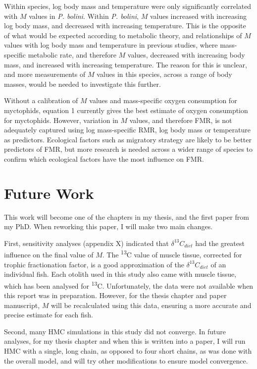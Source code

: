 \documentclass[12pt, titlepage]{article}
\begin{document}
Within species, log body mass and temperature were only significantly correlated with $M$ values in \textit{P. bolini}.
Within \textit{P. bolini}, $M$ values increased with increasing log body mass, and decreased with increasing temperature.
This is the opposite of what would be expected according to metabolic theory, and relationships of $M$ values with log body mass and temperature in previous studies, where mass-specific metabolic rate, and therefore $M$ values, decreased with increasing body mass, and increased with increasing temperature. %
The reason for this is unclear, and more measurements of $M$ values in this species, across a range of body masses, would be needed to investigate this further.

Without a calibration of $M$ values and mass-specific oxygen consumption for myctophids, equation 1 currently gives the best estimate of oxygen consumption for myctophids.
However, variation in $M$ values, and therefore FMR, is not adequately captured using log mass-specific RMR, log body mass or temperature as predictors.
Ecological factors such as migratory strategy are likely to be better predictors of FMR, but more research is needed across a wider range of species to confirm which ecological factors have the most influence on FMR.

\pagebreak
\section{Future Work}

This work will become one of the chapters in my thesis, and the first paper from my PhD.
When reworking this paper, I will make two main changes.

First, sensitivity analyses (appendix X) indicated that $\delta^{13}C_{diet}$ had the greatest influence on the final value of $M$. %
The \textdelta \textsuperscript{13}C value of muscle tissue, corrected for trophic fractionation factor, is a good approximation of the $\delta^{13}C_{diet}$ of an individual fish.
Each otolith used in this study also came with muscle tissue, which has been analysed for \textdelta \textsuperscript{13}C.
Unfortunately, the data were not available when this report was in preparation.
However, for the thesis chapter and paper manuscript, $M$ will be recalculated using this data, ensuring a more accurate and precise estimate for each fish.

Second, many HMC simulations in this study did not converge.
In future analyses, for my thesis chapter and when this is written into a paper, I will run HMC with a single, long chain, as opposed to four short chains, as was done with the overall model, and will try other modifications to ensure model convergence.
\end{document}
